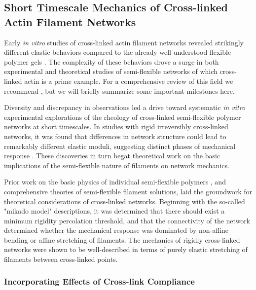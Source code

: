 \subsection{Short Timescale Mechanics of Cross-linked Actin Filament Networks}
\label{sec:semiflex}
Early {\em in vitro}  studies of cross-linked actin filament networks revealed strikingly different elastic behaviors compared to the already well-understood flexible polymer gels \cite{rheo_bench}.  The complexity of these behaviors drove a surge in both experimental and theoretical studies of semi-flexible networks of which cross-linked actin is a prime example.  For a comprehensive review of this field we recommend \cite{megareview}, but we will briefly summarize some important milestones here.

Diversity and discrepancy in observations led a drive toward systematic {\em in vitro} experimental explorations of the rheology of cross-linked semi-flexible polymer networks at short timescales.  In studies with rigid irreversibly cross-linked networks, it was found that differences in network structure could lead to remarkably different elastic moduli, suggesting distinct phases of mechanical response \cite{rheo_marge}.  These discoveries in turn begat theoretical work on the basic implications of the semi-flexible nature of filaments on network mechanics\cite{megareview}.  

Prior work on the basic physics of individual semi-flexible polymers \cite{mol_wlc,theo_doi_ed}, and comprehensive theories of semi-flexible filament solutions, \cite{theo_morse} laid the groundwork for theoretical considerations of cross-linked networks. Beginning with the so-called "mikado model" descriptions\cite{theo_hlm,theo_hlm2}, it was determined that there should exist a minimum rigidity percolation threshold, and that the connectivity of the network determined whether the mechanical response was dominated by non-affine bending or affine stretching of filaments.  The mechanics of rigidly cross-linked networks were shown to be well-described in terms of purely elastic stretching of filaments between cross-linked points\cite{theo_best}.  

\subsubsection{Incorporating Effects of Cross-link Compliance}

